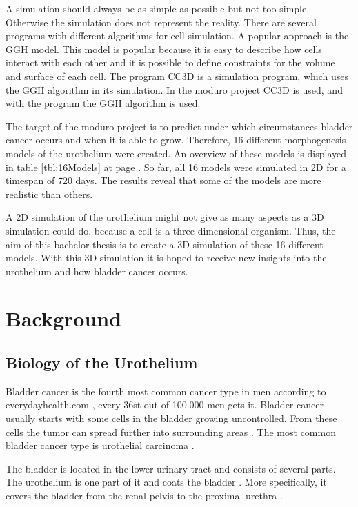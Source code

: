 A simulation should always be as simple as possible but not too simple. Otherwise the simulation does not represent the reality. 
There are several programs with different algorithms for cell simulation. A popular approach is the \ac{GGH} model. This model is popular because it is easy to describe how cells interact with each other and it is possible to define constraints for the volume and surface of each cell. \newline
The program \ac{CC3D} is a simulation program, which uses the \ac{GGH} algorithm in its simulation. In the moduro project \ac{CC3D} is used, and with the program the \ac{GGH} algorithm is used.

The target of the moduro project is to predict under which circumstances bladder cancer occurs and when it is able to grow. Therefore, 16 different morphogenesis models of the urothelium were created. An overview of these models is displayed in table \ref{tbl:16Models} at page \pageref{tbl:16Models}. So far, all 16 models were simulated in 2D for a timespan of 720 days. The results reveal that some of the models are more realistic than others.

A 2D simulation of the urothelium might not give as many aspects as a 3D simulation could do, because a cell is a three dimensional organism. Thus, the aim of this bachelor thesis is to create a 3D simulation of these 16 different models. With this 3D simulation it is hoped to receive new insights into the urothelium and how bladder cancer occurs.

\section{Background}
\subsection{Biology of the Urothelium}
Bladder cancer is the fourth most common cancer type in men according to everydayhealth.com \cite{EveryDayHealth.com}, every 36st out of 100.000 men gets it. Bladder cancer usually starts with some cells in the bladder growing uncontrolled. From these cells the tumor can spread further into surrounding areas \cite{Cancer.org}. The most common bladder cancer type is urothelial carcinoma \cite{Cancer.org}.

The bladder is located in the lower urinary tract and consists of several parts. The urothelium is one part of it and coats the bladder \cite{Lazzeri2006}. More specifically, it covers the bladder from the renal pelvis to the proximal urethra \cite{Yamany2014, Birder2005}.

